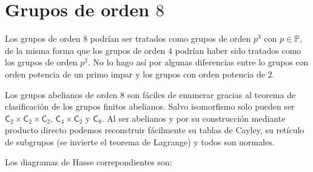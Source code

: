 \documentclass[12pt,a4paper,fleqn,spanish,final,openright]{extbook}
\theoremstyle{definition}
\theoremstyle{remark}
\begin{document}
    \chapter{Grupos de orden $8$}
    
    Los grupos de orden $8$ podrían ser tratados como grupos de orden $p^3$ con $p\in\mathds{P}$, de la misma forma que los grupos de orden $4$ podrían haber sido tratados como los grupos de orden $p^2$. No lo hago así por algunas diferencias entre lo grupos con orden potencia de un primo impar y los grupos con orden potencia de $2$.
    
    Los grupos abelianos de orden $8$ son fáciles de enumerar gracias al teorema de clasificación de los grupos finitos abelianos. Salvo isomorfismo solo pueden ser $\mathsf{C}_{2}\times\mathsf{C}_{2}\times\mathsf{C}_{2}$, $\mathsf{C}_{4}\times\mathsf{C}_{2}$ y $\mathsf{C}_{8}$. Al ser abelianos y por su construcción mediante producto directo podemos reconstruir fácilmente su tablas de Cayley, su retículo de subgrupos (se invierte el teorema de Lagrange) y todos son normales.
    
    Los diagramas de Hasse correpondientes son:
    
    
    
\end{document}
